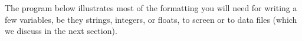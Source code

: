 \documentclass[letterpaper,10pt,english]{sphinxmanual}
\begin{document}
\sphinxAtStartPar
The program below illustrates most of the formatting you will need for writing a few variables, be they strings, integers, or floats, to screen or to data files (which we discuss in the next section).

\begin{sphinxVerbatim}[commandchars=\\\{\},numbers=left,firstnumber=1,stepnumber=1]
  
  
  
  
  
  


\end{sphinxVerbatim}
\end{document}
